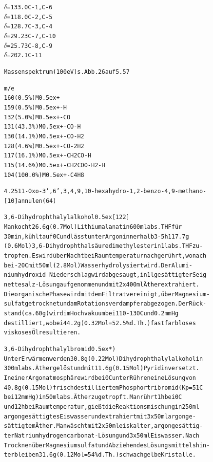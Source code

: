 \documentclass[a4paper,11pt]{article}
\begin{document}
\begin{alltt}
          \(\delta\) = 133.0          C-1, C-6
          \(\delta\) = 118.0          C-2, C-5
          \(\delta\) = 128.7          C-3, C-4
          \(\delta\) =  29.23         C-7, C-10
          \(\delta\) =  25.73         C-8, C-9
          \(\delta\) = 202.1          C-11


Massenspektrum (100 eV) s. Abb. 26 auf 5. 57

m/e
          160   (0.5 \%)      M\raise0.5ex\hbox{+}
          159   (0.5 \%)      M\raise0.5ex\hbox{+} - H
          132   (5.0 \%)      M\raise0.5ex\hbox{+} - CO
          131  (43.3 \%)      M\raise0.5ex\hbox{+} - CO - H
          130  (14.1 \%)      M\raise0.5ex\hbox{+} - CO - H2
          128   (4.6 \%)      M\raise0.5ex\hbox{+} - CO - 2 H2
          117  (16.1 \%)      M\raise0.5ex\hbox{+} - CH2CO - H
          115  (14.6 \%)      M\raise0.5ex\hbox{+} - CH2COO - H2 - H
          104 (100.0 \%)      M\raise0.5ex\hbox{+} - C4H8

\newpage
{}


4.25 11-Oxo-3’‚6',3,4,9,10-hexahydro-1,2-benzo-4,9-methano-
     [10]annulen (64)

3,6-Dihydrophthalylalkohol \raise0.5ex\hbox{[122]}
Man kocht 26.6 g (0.7 Mol) Lithiumalanat in 600 ml abs. THF für
30 min, kühlt auf 0\degree{}C und lässt unter Argon innerhalb 3 - 5 h 117.7 g
(0.6 Mol) 3,6-Dihydrophthalsäuredimethylester in 1 l abs. THF zu-
tropfen. Es wird über Nacht bei Raumtemperatur nachgerührt, wonach
bei -20\degree{}C mit 50 ml (2.8 Mol) Wasser hydrolysiert wird. Der Alumi-
niumhydroxid-Niederschlag wird abgesaugt, in 1 l gesättigter Seig-
nettesalz-Lösung aufgenommen und mit 2 x 400 ml Äther extrahiert.
Die organische Phase wird mit dem Filtrat vereinigt, über Magnesium-
sulfat getrocknet und am Rotationsverdampfer abgezogen. Der Rück-
stand (ca. 60 g) wird im Hochvakuum bei 110 - 130\degree{}C und 0.2 mm Hg
destilliert, wobei 44.2 g (0.32 Mol = 52.5 \% d.Th.) fast farbloses
viskoses Öl resultieren.

3,6-Dihydrophthalylbromid \leavevmode\raise0.5ex\hbox{*})
Unter Erwärmen werden 30.8 g (0.22 Mol) Dihydrophthalylalkohol in
300 ml abs. Äther gelöst und mit 11.6 g (0.15 Mol) Pyridin versetzt.
In einer Argonatmosphäre wird bei 0\degree{}C unter Rühren eine Lösung von
40.8 g (0.15 Mol) frisch destilliertem Phosphortribromid (Kp = 51\degree{}C
bei 12 mm Hg) in 50 ml abs. Äther zugetropft. Man rührt 1 h bei 0\degree{}C
und 12 h bei Raumtemperatur, gießt die Reaktionsmischung in 250 ml
argongesättigtes Eiswasser und extrahiert mit 3 x 50 ml argonge-
sättigtem Äther. Man wäscht mit 2 x 50 ml eiskalter, argongesättig-
ter Natriumhydrogencarbonat-Lösung und 3 x 50 ml Eiswasser. Nach
Trocknen über Magnesiumsulfat und Abziehen des Lösungsmittels hin-
terbleiben 31.6 g (0.12 Mol = 54 \% d.Th.) schwach gelbe Kristalle.



\end{alltt}
\end{document}
